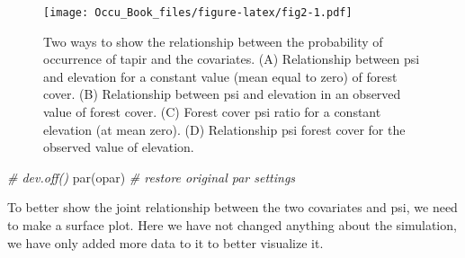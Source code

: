 \documentclass[
]{book}
\newenvironment{Shaded}{\begin{snugshade}}{\end{snugshade}}
\newcommand{\CommentTok}[1]{\textcolor[rgb]{0.56,0.35,0.01}{\textit{#1}}}
\newcommand{\FunctionTok}[1]{\textcolor[rgb]{0.00,0.00,0.00}{#1}}
\newcommand{\NormalTok}[1]{#1}
\begin{document}
\begin{figure}
\centering
\texttt{[image: Occu\_Book\_files/figure-latex/fig2-1.pdf]}
\caption{\label{fig:fig2}Two ways to show the relationship between the probability of occurrence of tapir and the covariates. (A) Relationship between psi and elevation for a constant value (mean equal to zero) of forest cover. (B) Relationship between psi and elevation in an observed value of forest cover. (C) Forest cover psi ratio for a constant elevation (at mean zero). (D) Relationship psi forest cover for the observed value of elevation.}
\end{figure}

\begin{Shaded}
\begin{Highlighting}[]
\CommentTok{\# dev.off()}
\FunctionTok{par}\NormalTok{(opar)          }\CommentTok{\# restore original par settings}
\end{Highlighting}
\end{Shaded}

To better show the joint relationship between the two covariates and psi, we need to make a surface plot. Here we have not changed anything about the simulation, we have only added more data to it to better visualize it.
\end{document}
